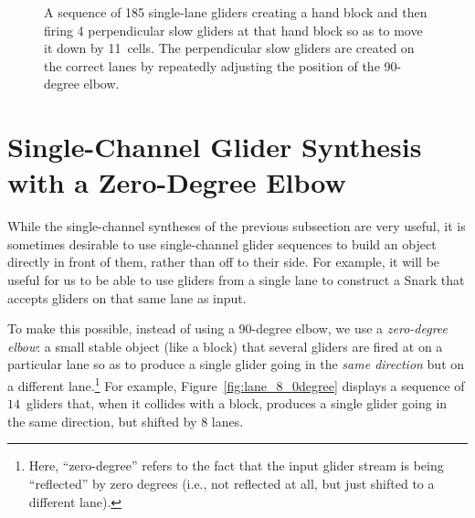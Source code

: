 \begin{figure}[!htb]
	
	\caption{A sequence of 185 single-lane gliders creating a hand block and then firing 4 perpendicular slow gliders at that hand block so as to move it down by 11~cells. The perpendicular slow gliders are created on the correct lanes by repeatedly adjusting the position of the 90-degree elbow.}\label{fig:90_degree_block_move}
\end{figure}



\section{Single-Channel Glider Synthesis with a Zero-Degree Elbow}\label{sec:single_channel_synth_0}

While the single-channel syntheses of the previous subsection are very useful, it is sometimes desirable to use single-channel glider sequences to build an object directly in front of them, rather than off to their side. For example, it will be useful for us to be able to use gliders from a single lane to construct a Snark that accepts gliders on that same lane as input.

To make this possible, instead of using a 90-degree elbow, we use a \emph{zero-degree elbow}: a small stable object (like a block) that several gliders are fired at on a particular lane so as to produce a single glider going in the \emph{same direction} but on a different lane.\footnote{Here, ``zero-degree'' refers to the fact that the input glider stream is being ``reflected'' by zero degrees (i.e., not reflected at all, but just shifted to a different lane).} For example, Figure~\ref{fig:lane_8_0degree} displays a sequence of $14$~gliders that, when it collides with a block, produces a single glider going in the same direction, but shifted by $8$ lanes.

